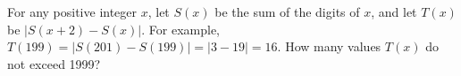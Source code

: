 For any positive integer $x$, let $S(x)$ be the sum of the digits of $x$, and let $T(x)$ be $|S(x+2)-S(x)|.$  For example, $T(199)=|S(201)-S(199)|=|3-19|=16.$  How many values $T(x)$ do not exceed 1999?